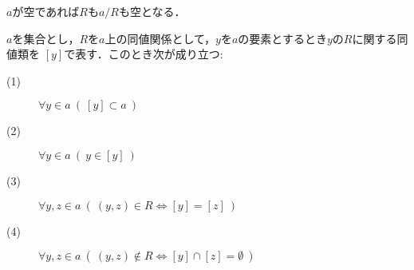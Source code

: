 	$a$が空であれば$R$も$a/R$も空となる．
	
	
	\begin{screen}
		\begin{thm}[同値類の性質]
			$a$を集合とし，$R$を$a$上の同値関係として，$y$を$a$の要素とするとき$y$の$R$に関する同値類を
			$[y]$で表す．このとき次が成り立つ:
			\begin{description}
				\item[(1)] $\forall y \in a\ \left(\ [y] \subset a\ \right)$
				\item[(2)] $\forall y \in a\ \left(\ y \in [y]\ \right)$
				\item[(3)] $\forall y,z \in a\ \left(\ (y,z) \in R \Longleftrightarrow [y] = [z]\ \right)$
				\item[(4)] $\forall y,z \in a\ \left(\ (y,z) \notin R \Longleftrightarrow [y] \cap [z] = \emptyset\ \right)$
			\end{description}
		\end{thm}
	\end{screen}
	
